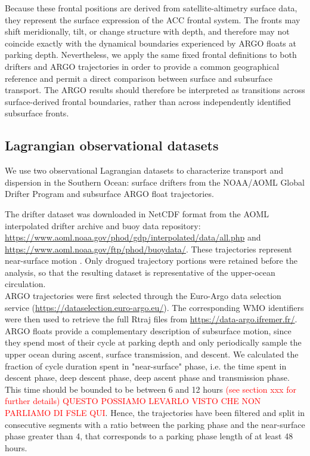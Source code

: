 \documentclass[
  draft
]{agujournal2025}
\begin{document}
        Because these frontal positions are derived from satellite-altimetry surface data, they represent the surface expression of the ACC frontal system. The fronts may shift meridionally, tilt, or change structure with depth, and therefore may not coincide exactly with the dynamical boundaries experienced by ARGO floats at parking depth. Nevertheless, we apply the same fixed frontal definitions to both drifters and ARGO trajectories in order to provide a common geographical reference and permit a direct comparison between surface and subsurface transport. The ARGO results should therefore be interpreted as transitions across surface-derived frontal boundaries, rather than across independently identified subsurface fronts.
    
    \subsection{Lagrangian observational datasets}
        We use two observational Lagrangian datasets to characterize transport and dispersion in the Southern Ocean: surface drifters from the NOAA/AOML Global Drifter Program and subsurface ARGO float trajectories.
        
        The drifter dataset was downloaded in NetCDF format from the AOML interpolated drifter archive and buoy data repository: \url{https://www.aoml.noaa.gov/phod/gdp/interpolated/data/all.php} and \url{https://www.aoml.noaa.gov/ftp/phod/buoydata/}. These trajectories represent near-surface motion \cite{data:lumpkin2019}. Only drogued trajectory portions were retained before the analysis, so that the resulting dataset is representative of the upper-ocean circulation.\\
        
        ARGO trajectories were first selected through the Euro-Argo data selection service (\url{https://dataselection.euro-argo.eu/}). The corresponding WMO identifiers were then used to retrieve the full Rtraj files from \url{https://data-argo.ifremer.fr/}. ARGO floats provide a complementary description of subsurface motion, since they spend most of their cycle at parking depth and only periodically sample the upper ocean during ascent, surface transmission, and descent. We calculated the fraction of cycle duration spent in "near-surface" phase, i.e. the time spent in descent phase, deep descent phase, deep ascent phase and transmission phase. This time should be bounded to be between 6 and 12 hours \textcolor{red}{(see section xxx for further details) QUESTO POSSIAMO LEVARLO VISTO CHE NON PARLIAMO DI FSLE QUI}. Hence, the trajectories have been filtered and split in consecutive segments with a ratio between the parking phase and the near-surface phase greater than 4, that corresponds to a parking phase length of at least 48 hours.
        
\end{document}
